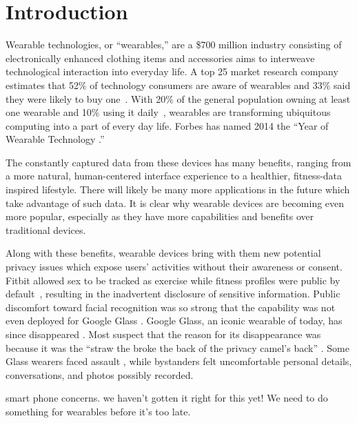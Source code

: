 
\section{Introduction}

Wearable technologies, or ``wearables,'' are a \$700 million industry \cite{cmo} consisting of electronically enhanced clothing items and accessories aims to interweave technological interaction into everyday life. A top 25 market research company estimates that 52\% of technology consumers are aware of wearables and 33\% said they were likely to buy one~\cite{NPD}. With 20\% of the general population owning at least one wearable and 10\% using it daily~\cite{WearableStatNews}, wearables are transforming ubiquitous computing into a part of every day life. Forbes has named 2014 the ``Year of Wearable Technology \cite{Forbes}.''

The constantly captured data from these devices has many benefits, ranging from a more natural, human-centered interface experience to a healthier, fitness-data inspired lifestyle. There will likely be many more applications in the future which take advantage of such data. It is clear why wearable devices are becoming even more popular, especially as they have more capabilities and benefits over traditional devices. 

Along with these benefits, wearable devices bring with them new potential privacy issues which expose users' activities without their awareness or consent. Fitbit allowed sex to be tracked as exercise while fitness profiles were public by default~\cite{Fitbit}, resulting in the inadvertent disclosure of sensitive information. Public discomfort toward facial recognition was so strong that the capability was not even deployed for Google Glass \cite{GlassDetection}. Google Glass, an iconic wearable of today, has since disappeared \cite{13_google_2015}. Most suspect that the reason for its disappearance was because it was the ``straw the broke the back of the privacy camel's back'' \cite{14_dvorak_2014}. Some Glass wearers faced assault \cite{1_russell_2014, 15_mashable_2014, 16_gross_2014}, while bystanders felt uncomfortable personal details, conversations, and photos possibly recorded.

{\color {red} smart phone concerns. we haven't gotten it right for this yet! We need to do something for wearables before it's too late.}

